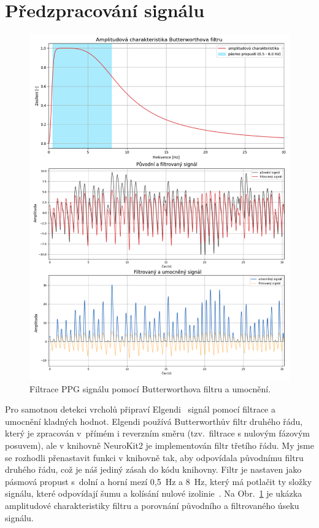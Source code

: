 \section{Předzpracování signálu}
\label{sec:preprocess}
\begin{figure}[!t]
	\centering
	\includegraphics[width=1\textwidth]{./obrazky/ElgendiAFC_PP_Sq.png}
	\caption[Elgendiho předzpracování PPG signálu]{Filtrace PPG signálu pomocí Butterworthova filtru a umocnění.}
	\label{fig:filter-example}
\end{figure}

Pro samotnou detekci vrcholů připraví Elgendi~\cite{Elgendi2013} signál pomocí filtrace a umocnění kladných hodnot.
Elgendi používá Butterworthův filtr druhého řádu, který je zpracován v~přímém i reverzním směru (tzv.~filtrace s nulovým fázovým posuvem), ale v knihovně NeuroKit2 je implementován filtr třetího řádu.
My jsme se rozhodli přenastavit funkci v knihovně tak, aby odpovídala původnímu filtru druhého řádu, což je náš jediný zásah do kódu knihovny.
Filtr je nastaven jako pásmová propust s~dolní a horní mezí 0,5~Hz a 8~Hz, který má potlačit ty složky signálu, které odpovídají šumu a kolísání nulové izolinie~\cite{Elgendi2013}.
Na Obr.~\ref{fig:filter-example} je ukázka amplitudové charakteristiky filtru a porovnání původního a filtrovaného úseku signálu.

